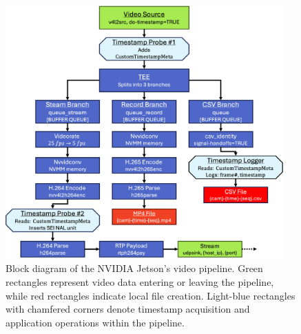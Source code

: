 \documentclass{erauthesis}
\begin{document}
\begin{figure}[htbp]
\centering
\includegraphics[width=0.95\textwidth]{Images/gstreamer_block.png}
\caption{Block diagram of the NVIDIA Jetson's video pipeline. Green rectangles represent video data entering or leaving the pipeline, while red rectangles indicate local file creation. Light-blue rectangles with chamfered corners denote timestamp acquisition and application operations within the pipeline.}
\label{fig_video_pipeline}
\end{figure}



%        
\end{document}
